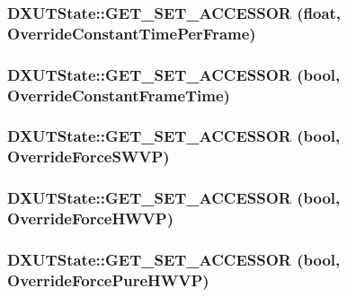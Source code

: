 \label{class_d_x_u_t_state_afac280cfbacc515dbdea3e987bfd50a6}
\hypertarget{class_d_x_u_t_state_a22c820fde6f74295f8fd04164cf6422e}{
\subsubsection[{GET\_\-SET\_\-ACCESSOR}]{\setlength{\rightskip}{0pt plus 5cm}DXUTState::GET\_\-SET\_\-ACCESSOR (float, \/  OverrideConstantTimePerFrame)}}
\label{class_d_x_u_t_state_a22c820fde6f74295f8fd04164cf6422e}
\hypertarget{class_d_x_u_t_state_a0d6827fb6471a413367e889ee923d475}{
\subsubsection[{GET\_\-SET\_\-ACCESSOR}]{\setlength{\rightskip}{0pt plus 5cm}DXUTState::GET\_\-SET\_\-ACCESSOR (bool, \/  OverrideConstantFrameTime)}}
\label{class_d_x_u_t_state_a0d6827fb6471a413367e889ee923d475}
\hypertarget{class_d_x_u_t_state_acfc2391d791bf76af4853114077ff8ce}{
\subsubsection[{GET\_\-SET\_\-ACCESSOR}]{\setlength{\rightskip}{0pt plus 5cm}DXUTState::GET\_\-SET\_\-ACCESSOR (bool, \/  OverrideForceSWVP)}}
\label{class_d_x_u_t_state_acfc2391d791bf76af4853114077ff8ce}
\hypertarget{class_d_x_u_t_state_a4922565ac94b61cf14981bb3e0ca2d25}{
\subsubsection[{GET\_\-SET\_\-ACCESSOR}]{\setlength{\rightskip}{0pt plus 5cm}DXUTState::GET\_\-SET\_\-ACCESSOR (bool, \/  OverrideForceHWVP)}}
\label{class_d_x_u_t_state_a4922565ac94b61cf14981bb3e0ca2d25}
\hypertarget{class_d_x_u_t_state_af946c3e5a8cd41dc434c5d3fe5e970de}{
\subsubsection[{GET\_\-SET\_\-ACCESSOR}]{\setlength{\rightskip}{0pt plus 5cm}DXUTState::GET\_\-SET\_\-ACCESSOR (bool, \/  OverrideForcePureHWVP)}}
